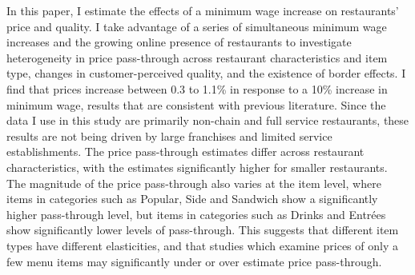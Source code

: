 \documentclass[11pt]{article}
\begin{document}
In this paper, I estimate the effects of a minimum wage increase on restaurants' price and quality. I take advantage of a series of simultaneous minimum wage increases and the growing online presence of restaurants to investigate heterogeneity in price pass-through across restaurant characteristics and item type, changes in customer-perceived quality, and the existence of border effects. I find that prices increase between 0.3 to 1.1\% in response to a 10\% increase in minimum wage, results that are consistent with previous literature. Since the data I use in this study are primarily non-chain and full service restaurants, these results are not being driven by large franchises and limited service establishments. 
The price pass-through estimates differ across restaurant characteristics, with the estimates significantly higher for smaller restaurants. 
The magnitude of the price pass-through also varies at the item level, where items in categories such as Popular, Side and Sandwich show a significantly higher pass-through level, but items in categories such as Drinks and Entr\'ees show significantly lower levels of pass-through. This suggests that different item types have different elasticities, and that studies which examine prices of only a few menu items may significantly under or over estimate price pass-through.
\end{document}
